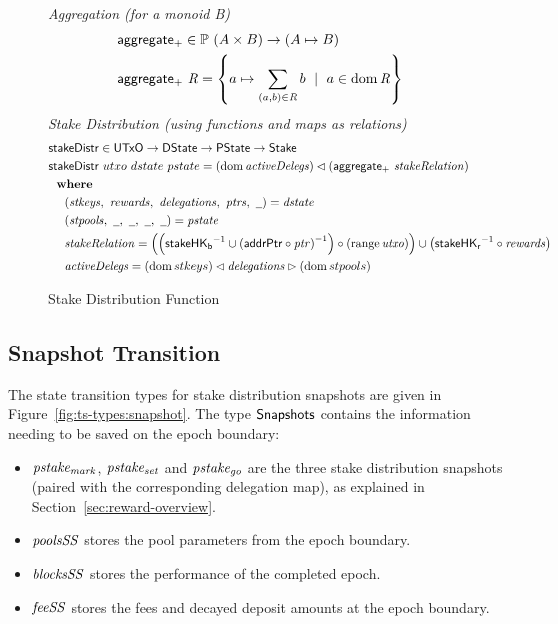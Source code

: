\begin{figure}[htb]
  \emph{Aggregation (for a monoid B)}
  \begin{align*}
      & \mathsf{aggregate_{+}} \in \mathbb{P}~(A \times B) \to (A\mapsto B) \\
      & \mathsf{aggregate_{+}}~\mathit{R} = \left\{a\mapsto \sum_{(a,b)\in\mathit{R}}b
          ~\mid~a\in\operatorname{dom}\mathit{R}\right\} \\
  \end{align*}
  \emph{Stake Distribution (using functions and maps as relations)}
  \begin{align*}
      & \fun{stakeDistr} \in \UTxO \to \DState \to \PState \to \Stake \\
      & \fun{stakeDistr}~{utxo}~{dstate}~{pstate} =
      (\dom{\var{activeDelegs}})\restrictdom\left(\fun{aggregate_{+}}~\var{stakeRelation}\right)\\
      & \where \\
      & ~~~~ (\var{stkeys},~\var{rewards},~\var{delegations},~\var{ptrs},~\wcard) = \var{dstate} \\
      & ~~~~ (\var{stpools},~\wcard,~\wcard,~\wcard,~\wcard) = \var{pstate} \\
      & ~~~~ \var{stakeRelation} = \left(
        \left(\fun{stakeHK_b}^{-1}\cup\left(\fun{addrPtr}\circ\var{ptr}\right)^{-1}\right)
        \circ\left(\range{\var{utxo}}\right)
        \right)
        \cup \left(\fun{stakeHK_r}^{-1}\circ\var{rewards}\right) \\
      & ~~~~ \var{activeDelegs} =
               (\dom{stkeys}) \restrictdom \var{delegations} \restrictrange (\dom{stpools}) \\
  \end{align*}

  \caption{Stake Distribution Function}
  \label{fig:functions:stake-distribution}
\end{figure}

\clearpage

\subsection{Snapshot Transition}
\label{sec:snapshots}

The state transition types for stake distribution snapshots are given in
Figure~\ref{fig:ts-types:snapshot}. The type $\mathsf{\mathsf{Snapshots}}$ contains the
information needing to be saved on the epoch boundary:
\begin{itemize}
  \item $\mathit{pstake_{mark}}$, $\mathit{pstake_{set}}$ and $\mathit{pstake_{go}}$ are the three
    stake distribution snapshots (paired with the corresponding delegation map),
    as explained in Section~\ref{sec:reward-overview}.
  \item $\mathit{poolsSS}$ stores the pool parameters from the epoch boundary.
  \item $\mathit{blocksSS}$ stores the performance of the completed epoch.
  \item $\mathit{feeSS}$ stores the fees and decayed deposit amounts at the epoch boundary.
\end{itemize}

